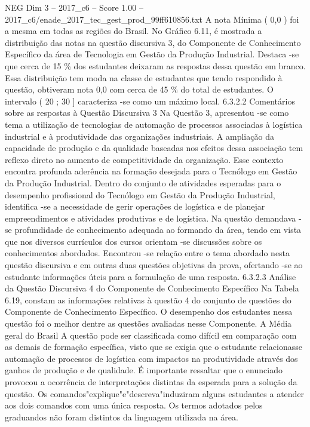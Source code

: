 \begin{textsample}{NEG Dim 3 – 2017\_c6 – Score 1.00 – 2017\_c6/enade\_2017\_tec\_gest\_prod\_99ff610856.txt}
A nota Mínima ( 0,0 ) foi a mesma em todas as regiões do Brasil.
No Gráfico 6.11, é mostrada a distribuição das notas na questão discursiva 3, do Componente de Conhecimento Específico da área de Tecnologia em Gestão da Produção Industrial.
Destaca -se que cerca de 15 \% dos estudantes deixaram as respostas dessa questão em branco.
Essa distribuição tem moda na classe de estudantes que tendo respondido à questão, obtiveram nota 0,0 com cerca de 45 \% do total de estudantes.
O intervalo ( 20 ; 30 ] caracteriza -se como um máximo local. 6.3.2.2 Comentários sobre as respostas à Questão Discursiva 3 Na Questão 3, apresentou -se como tema a utilização de tecnologias de automação de processos associadas à logística industrial e à produtividade das organizações industriais.
A ampliação da capacidade de produção e da qualidade baseadas nos efeitos dessa associação tem reflexo direto no aumento de competitividade da organização.
Esse contexto encontra profunda aderência na formação desejada para o Tecnólogo em Gestão da Produção Industrial.
Dentro do conjunto de atividades esperadas para o desempenho profissional do Tecnólogo em Gestão da Produção Industrial, identifica -se a necessidade de gerir operações de logística e de planejar empreendimentos e atividades produtivas e de logística.
Na questão demandava -se profundidade de conhecimento adequada ao formando da área, tendo em vista que nos diversos currículos dos cursos orientam -se discussões sobre os conhecimentos abordados.
Encontrou -se relação entre o tema abordado nesta questão discursiva e em outras duas questões objetivas da prova, ofertando -se ao estudante informações úteis para a formulação de uma resposta. 6.3.2.3 Análise da Questão Discursiva 4 do Componente de Conhecimento Específico Na Tabela 6.19, constam as informações relativas à questão 4 do conjunto de questões do Componente de Conhecimento Específico.
O desempenho dos estudantes nessa questão foi o melhor dentre as questões avaliadas nesse Componente.
A Média geral do Brasil A questão pode ser classificada como difícil em comparação com as demais de formação específica, visto que se exigia que o estudante relacionasse automação de processos de logística com impactos na produtividade através dos ganhos de produção e de qualidade.
É importante ressaltar que o enunciado provocou a ocorrência de interpretações distintas da esperada para a solução da questão.
Os comandos"explique"e"descreva"induziram alguns estudantes a atender aos dois comandos com uma única resposta.
Os termos adotados pelos graduandos não foram distintos da linguagem utilizada na área.

\end{textsample}

